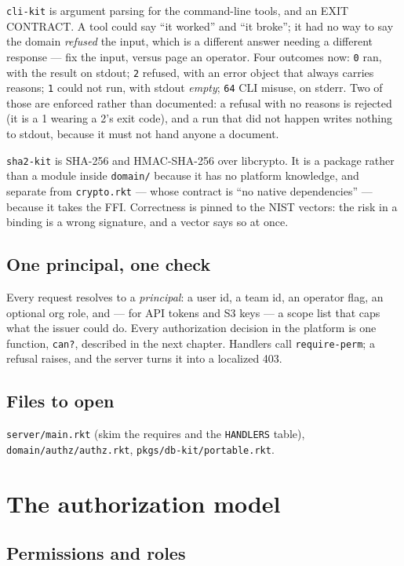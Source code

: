 \documentclass[11pt,a4paper]{report}
\gdef\currentchapterart{art/telemachus-head.png}
\newcommand{\chapterart}[1]{\gdef\currentchapterart{#1}}
\newcommand{\chapterart}[1]{}
\begin{document}
\texttt{cli-kit} is argument parsing for the command-line tools, and an EXIT CONTRACT. A tool could say ``it worked'' and ``it broke''; it had no way to say the domain \emph{refused} the input, which is a different answer needing a different response --- fix the input, versus page an operator. Four outcomes now: \texttt{0} ran, with the result on stdout; \texttt{2} refused, with an error object that always carries reasons; \texttt{1} could not run, with stdout \emph{empty}; \texttt{64} CLI misuse, on stderr. Two of those are enforced rather than documented: a refusal with no reasons is rejected (it is a 1 wearing a 2's exit code), and a run that did not happen writes nothing to stdout, because it must not hand anyone a document.

\texttt{sha2-kit} is SHA-256 and HMAC-SHA-256 over libcrypto. It is a package rather than a module inside \texttt{domain/} because it has no platform knowledge, and separate from \texttt{crypto.rkt} --- whose contract is ``no native dependencies'' --- because it takes the FFI. Correctness is pinned to the NIST vectors: the risk in a binding is a wrong signature, and a vector says so at once.

\section{One principal, one check}

Every request resolves to a \emph{principal}: a user id, a team id, an operator flag, an optional org role, and --- for API tokens and S3 keys --- a scope list that caps what the issuer could do. Every authorization decision in the platform is one function, \texttt{can?}, described in the next chapter. Handlers call \texttt{require-perm}; a refusal raises, and the server turns it into a localized 403.

\section{Files to open}

\texttt{server/main.rkt} (skim the requires and the \texttt{HANDLERS} table), \texttt{domain/authz/authz.rkt}, \texttt{pkgs/db-kit/portable.rkt}.

\chapterart{art/ch-04-authz.png}
\chapter{The authorization model}

\section{Permissions and roles}
\end{document}
